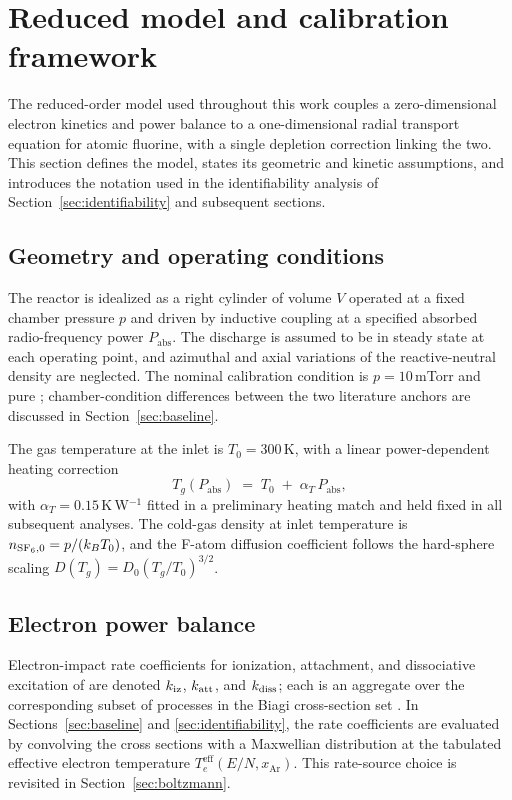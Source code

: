 \section{Reduced model and calibration framework}
\label{sec:model}

The reduced-order model used throughout this work couples a
zero-dimensional electron kinetics and power balance to a
one-dimensional radial transport equation for atomic fluorine, with
a single depletion correction linking the two. This section defines
the model, states its geometric and kinetic assumptions, and
introduces the notation used in the identifiability analysis of
Section~\ref{sec:identifiability} and subsequent sections.

\subsection{Geometry and operating conditions}
\label{sec:model:geometry}

The reactor is idealized as a right cylinder of volume $V$ operated
at a fixed chamber pressure $p$ and driven by inductive coupling at
a specified absorbed radio-frequency power $P_{\mathrm{abs}}$. The
discharge is assumed to be in steady state at each operating point,
and azimuthal and axial variations of the reactive-neutral density
are neglected. The nominal calibration condition is
$p = 10$\,mTorr and pure \sfsix{}; chamber-condition differences
between the two literature anchors are discussed in
Section~\ref{sec:baseline}.

The gas temperature at the inlet is $T_0 = 300$\,K, with a linear
power-dependent heating correction
\begin{equation}
  T_g(P_{\mathrm{abs}}) \;=\; T_0 \;+\; \alpha_T\,P_{\mathrm{abs}},
  \label{eq:gas-heating}
\end{equation}
with $\alpha_T = 0.15$\,K\,W$^{-1}$ fitted in a preliminary heating
match and held fixed in all subsequent analyses. The cold-gas
\sfsix{} density at inlet temperature is
$n_{\mathrm{SF}_6,0} = p/(k_B T_0)$, and the F-atom diffusion coefficient
follows the hard-sphere scaling $D(T_g) = D_0(T_g/T_0)^{3/2}$.

\subsection{Electron power balance}
\label{sec:model:power}

Electron-impact rate coefficients for ionization, attachment, and
dissociative excitation of \sfsix{} are denoted
$k_{\mathrm{iz}}$, $k_{\mathrm{att}}$, and $k_{\mathrm{diss}}$; each is an aggregate
over the corresponding subset of processes in the Biagi
cross-section set \citep{biagi}. In Sections~\ref{sec:baseline} and
\ref{sec:identifiability}, the rate coefficients are evaluated by
convolving the cross sections with a Maxwellian distribution at the
tabulated effective electron temperature
$T_e^{\mathrm{eff}}(E/N,x_{\mathrm{Ar}})$. This rate-source choice
is revisited in Section~\ref{sec:boltzmann}.

